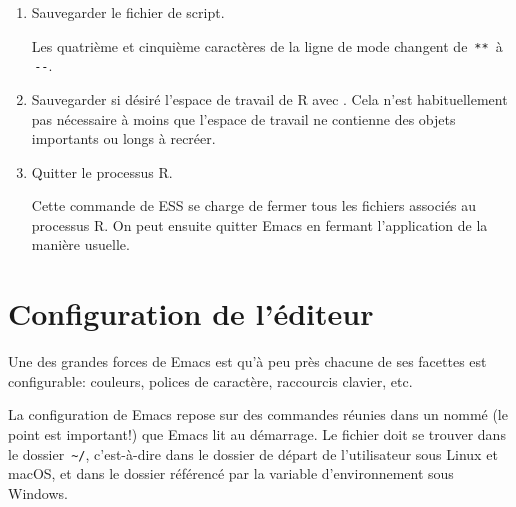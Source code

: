 \begin{enumerate}
\begin{trivlist}
    \hfill
  \end{trivlist}
\item Sauvegarder le fichier de script.
  Les quatrième et cinquième caractères de la ligne de mode changent
  de \,\verb|**|\, à \,\verb|--|.
\item Sauvegarder si désiré l'espace de travail de R avec
  . Cela n'est
  habituellement pas nécessaire à moins que l'espace de travail ne
  contienne des objets importants ou longs à recréer.
\item Quitter le processus R.
  Cette commande de ESS se charge de fermer tous les fichiers associés
  au processus R. On peut ensuite quitter Emacs en fermant
  l'application de la manière usuelle.
\end{enumerate}



\section{Configuration de l'éditeur}
\label{sec:emacs+ess:configuration}

Une des grandes forces de Emacs est qu'à peu près chacune de ses
facettes est configurable: couleurs, polices de caractère, raccourcis
clavier, etc.

La configuration de Emacs repose sur des commandes réunies dans un %
nommé  (le point est important!) que Emacs lit au
démarrage. Le fichier  doit se trouver dans le dossier
\,\verb=~/=, c'est-à-dire dans le dossier de départ de l'utilisateur
sous Linux et macOS, et dans le dossier référencé par la variable
d'environnement  sous Windows.


